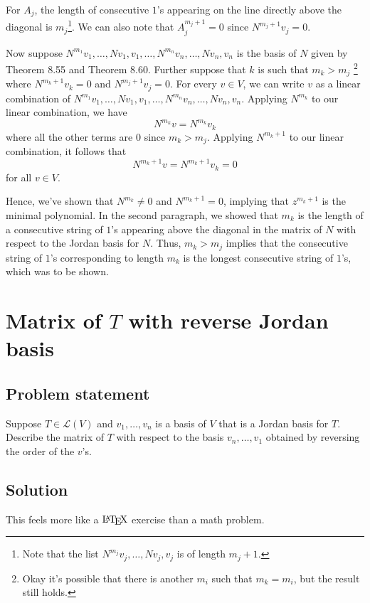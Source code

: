 \documentclass{article}
\begin{document}
For $A_j$, the length of consecutive $1$'s appearing on the line directly above the diagonal is $m_j$\footnote{Note that the list $N^{m_j}v_j,\ldots,Nv_j,v_j$ is of length $m_j+1$.}. 
We can also note that $A_j^{m_j+1}=0$ since $N^{m_j+1}v_j=0$.

Now suppose $N^{m_1}v_1,\ldots,Nv_1,v_1,\ldots,N^{m_n}v_n,\ldots,Nv_n,v_n$ is the basis of $N$ given by Theorem 8.55 and Theorem 8.60. 
Further suppose that $k$ is such that $m_k > m_j$
\footnote{Okay it's possible that there is another $m_i$ such that $m_k=m_i$, but the result still holds.} 
where $N^{m_k+1}v_k=0$ and $N^{m_j+1}v_j=0$. 
For every $v\in V$, we can write $v$ as a linear combination of $N^{m_1}v_1,\ldots,Nv_1,v_1,\ldots,N^{m_n}v_n,\ldots,Nv_n,v_n$. 
Applying $N^{m_k}$ to our linear combination, we have 
\[N^{m_k}v=N^{m_k}v_k\]
where all the other terms are $0$ since $m_k > m_j$. 
Applying $N^{m_k+1}$ to our linear combination, it follows that
\[N^{m_k+1}v=N^{m_k+1}v_k=0\]
for all $v\in V$.

Hence, we've shown that $N^{m_k}\neq0$ and $N^{m_k+1}=0$, implying that $z^{m_k+1}$ is the minimal polynomial. In the second paragraph, we showed that $m_k$ is the length of a consecutive string of $1$'s appearing above the diagonal in the matrix of $N$ with respect to the Jordan basis for $N$. Thus, $m_k > m_j$ implies that the consecutive string of $1$'s corresponding to length $m_k$ is the longest consecutive string of $1$'s, which was to be shown.

\clearpage

\section{Matrix of $T$ with reverse Jordan basis}
\subsection*{Problem statement}
Suppose $T\in\mathcal{L}(V)$ and $v_1,\dots,v_n$ is a basis of $V$ that is a Jordan basis for $T$. Describe the matrix of $T$ with respect to the basis $v_n,\ldots,v_1$ obtained by reversing the order of the $v$'s.

\subsection*{Solution}
This feels more like a $\text{\LaTeX}$ exercise than a math problem.
\end{document}
